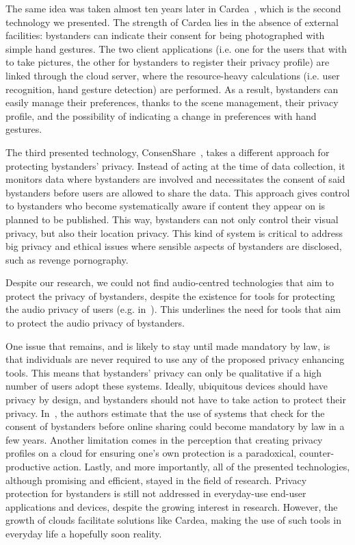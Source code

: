 \documentclass[conference]{IEEEtran}
\begin{document}
The same idea was taken almost ten years later in Cardea~\cite{shu2016cardea}, which is the second technology we presented. The strength of Cardea lies in the absence of external facilities: bystanders can indicate their consent for being photographed with simple hand gestures. The two client applications (i.e. one for the users that with to take pictures, the other for bystanders to register their privacy profile) are linked through the cloud server, where the resource-heavy calculations (i.e. user recognition, hand gesture detection) are performed. As a result, bystanders can easily manage their preferences, thanks to the scene management, their privacy profile, and the possibility of indicating a change in preferences with hand gestures. 

The third presented technology, ConsenShare~\cite{olteanu2018consensual}, takes a different approach for protecting bystanders' privacy. Instead of acting at the time of data collection, it monitors data where bystanders are involved and necessitates the consent of said bystanders before users are allowed to share the data. This approach gives control to bystanders who become systematically aware if content they appear on is planned to be published. This way, bystanders can not only control their visual privacy, but also their location privacy. This kind of system is critical to address big privacy and ethical issues where sensible aspects of bystanders are disclosed, such as revenge pornography. 

Despite our research, we could not find audio-centred technologies that aim to protect the privacy of bystanders, despite the existence for tools for protecting the audio privacy of users (e.g. in~\cite{larson2011accurate, ahmed2020preech}). This underlines the need for tools that aim to protect the audio privacy of bystanders. 

One issue that remains, and is likely to stay until made mandatory by law, is that individuals are never required to use any of the proposed privacy enhancing tools. This means that bystanders' privacy can only be qualitative if a high number of users adopt these systems. Ideally, ubiquitous devices should have privacy by design, and bystanders should not have to take action to protect their privacy. In~\cite{olteanu2018consensual}, the authors estimate that the use of systems that check for the consent of bystanders before online sharing could become mandatory by law in a few years. Another limitation comes in the perception that creating privacy profiles on a cloud for ensuring one's own protection is a paradoxical, counter-productive action. Lastly, and more importantly, all of the presented technologies, although promising and efficient, stayed in the field of research. Privacy protection for bystanders is still not addressed in everyday-use end-user applications and devices, despite the growing interest in research. However, the growth of clouds facilitate solutions like Cardea, making the use of such tools in everyday life a hopefully soon reality.
\end{document}
